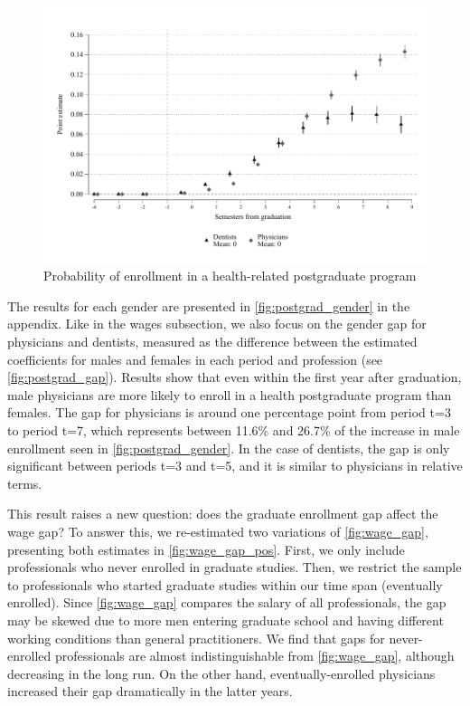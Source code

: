 \documentclass[12pt, a4paper]{article}
\begin{document}
\begin{figure}[H]
\caption{Probability of enrollment in a health-related postgraduate program}\label{fig:postgrad}
\centering 
\includegraphics[width=\textwidth]{Figures/Callaway SantAnna/ES_posgrado_salud_all.pdf}
\end{figure}

The results for each gender are presented in \autoref{fig:postgrad_gender} in the appendix. Like in the wages subsection, we also focus on the gender gap for physicians and dentists, measured as the difference between the estimated coefficients for males and females in each period and profession (see \autoref{fig:postgrad_gap}). Results show that even within the first year after graduation, male physicians are more likely to enroll in a health postgraduate program than females. The gap for physicians is around one percentage point from period t=3 to period t=7, which represents between 11.6\% and 26.7\% of the increase in male enrollment seen in \autoref{fig:postgrad_gender}. In the case of dentists, the gap is only significant between periods t=3 and t=5, and it is similar to physicians in relative terms.

This result raises a new question: does the graduate enrollment gap affect the wage gap? To answer this, we re-estimated two variations of \autoref{fig:wage_gap}, presenting both estimates in \autoref{fig:wage_gap_pos}. First, we only include professionals who never enrolled in graduate studies. Then, we restrict the sample to professionals who started graduate studies within our time span (eventually enrolled). Since \autoref{fig:wage_gap} compares the salary of all professionals, the gap may be skewed due to more men entering graduate school and having different working conditions than general practitioners. We find that gaps for never-enrolled professionals are almost indistinguishable from \autoref{fig:wage_gap}, although decreasing in the long run. On the other hand, eventually-enrolled physicians increased their gap dramatically in the latter years.
\end{document}
